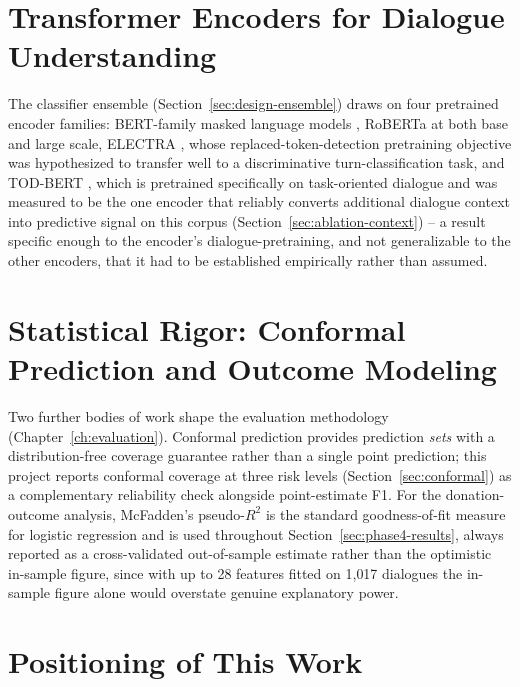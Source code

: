 \section{Transformer Encoders for Dialogue Understanding}

The classifier ensemble (Section~\ref{sec:design-ensemble}) draws on four
pretrained encoder families: BERT-family masked language models
\citep{devlin2019bert}, RoBERTa \citep{liu2019roberta} at both base and large
scale, ELECTRA \citep{clark2020electra}, whose replaced-token-detection
pretraining objective was hypothesized to transfer well to a discriminative
turn-classification task, and TOD-BERT \citep{wu2020todbert}, which is
pretrained specifically on task-oriented dialogue and was measured to be the
one encoder that reliably converts additional dialogue context into
predictive signal on this corpus (Section~\ref{sec:ablation-context}) --
a result specific enough to the encoder's dialogue-pretraining, and not
generalizable to the other encoders, that it had to be established
empirically rather than assumed.

\section{Statistical Rigor: Conformal Prediction and Outcome Modeling}

Two further bodies of work shape the evaluation methodology
(Chapter~\ref{ch:evaluation}). Conformal prediction
\citep{vovk2005conformal} provides prediction \emph{sets} with a
distribution-free coverage guarantee rather than a single point prediction;
this project reports conformal coverage at three risk levels
(Section~\ref{sec:conformal}) as a complementary reliability check alongside
point-estimate F1. For the donation-outcome analysis, McFadden's pseudo-$R^2$
\citep{mcfadden1974conditional} is the standard goodness-of-fit measure for
logistic regression and is used throughout Section~\ref{sec:phase4-results},
always reported as a cross-validated out-of-sample estimate rather than the
optimistic in-sample figure, since with up to 28 features fitted on 1{,}017
dialogues the in-sample figure alone would overstate genuine explanatory
power.

\section{Positioning of This Work}

